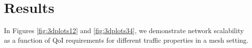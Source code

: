 
\section{Results}
\label{sec:results}

In Figures \ref{fig:3dplots12} and \ref{fig:3dplots34}, we demonstrate network scalability as a function of QoI requirements for different traffic properties in a mesh setting.

\begin{figure}
\centering
    


\end{figure}
